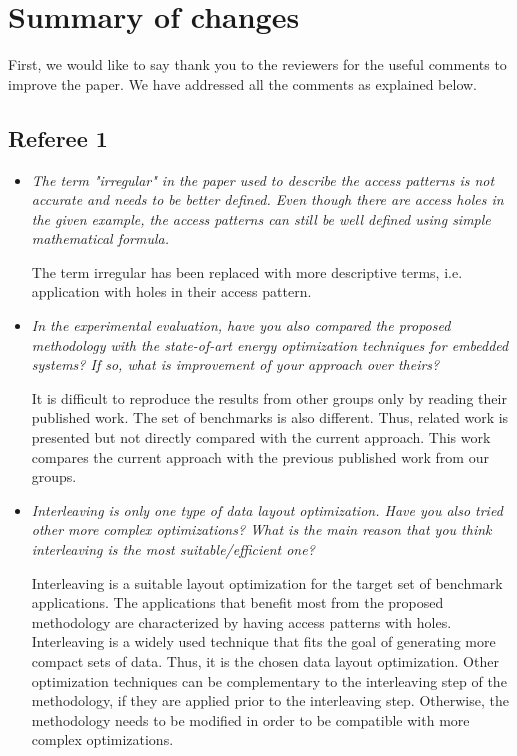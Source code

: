 \documentclass[12pt,a4paper,notitlepage]{article}
\author{Iason}
\begin{document}
\section*{Summary of changes}

First, we would like to say thank you to the reviewers for the useful comments to improve the paper. We have addressed all the comments as explained below.

\subsection*{Referee 1}

\begin{itemize}

\item \textit{The term "irregular" in the paper used to describe the access patterns is not accurate and needs to be better defined. Even though there are access holes in the given example, the access patterns can still be well defined using simple mathematical formula.}

The term irregular has been replaced with more descriptive terms, i.e. application with holes in their access pattern.

\item \textit{In the experimental evaluation, have you also compared the proposed methodology with the state-of-art energy optimization techniques for embedded systems? If so, what is improvement of your approach over theirs?}

It is difficult to reproduce the results from other groups only by reading their published work. The set of benchmarks is also different. Thus, related work is presented but not directly compared with the current approach. This work compares the current approach with the previous published work from our groups.

\item \textit{Interleaving is only one type of data layout optimization. Have you also tried other more complex optimizations? What is the main reason that you think interleaving is the most suitable/efficient one?}

Interleaving is a suitable layout optimization for the target set of benchmark applications.
The applications that benefit most from the proposed methodology are characterized by having access patterns with holes.
Interleaving is a widely used technique that fits the goal of generating more compact sets of data.
Thus, it is the chosen data layout optimization.
Other optimization techniques can be complementary to the interleaving step of the methodology, if they are applied prior to the interleaving step.
Otherwise, the methodology needs to be modified in order to be compatible with more complex optimizations.


\end{itemize}
\end{document}
